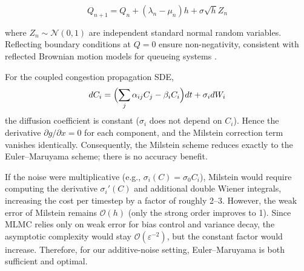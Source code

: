 \documentclass{ieeeaccess}
\begin{document}
\begin{equation}
    Q_{n+1} = Q_n + (\lambda_n - \mu_n)h + \sigma\sqrt{h}Z_n
    \label{eq:euler}
\end{equation}

\noindent where $Z_n \sim \mathcal{N}(0,1)$ are independent standard normal random variables.
Reflecting boundary conditions at $Q=0$ ensure non-negativity, consistent with reflected Brownian
motion models for queueing systems \cite{harrison1985}.
 
For the coupled congestion propagation SDE,
\begin{equation}\label{eq:3}
    dC_i = \Bigl(\sum_j \alpha_{ij}C_j - \beta_i C_i\Bigr)dt + \sigma_i dW_i
\end{equation}
the diffusion coefficient is constant (\(\sigma_i\) does not depend on \(C_i\)). 
Hence the derivative \(\partial g/\partial x = 0\) for each component, and the Milstein correction term vanishes identically. 
Consequently, the Milstein scheme reduces exactly to the Euler--Maruyama scheme; there is no accuracy benefit.

If the noise were multiplicative (e.g., \(\sigma_i(C) = \sigma_0 C_i\)), Milstein would require computing the derivative \(\sigma_i'(C)\) and additional double Wiener integrals, increasing the cost per timestep by a factor of roughly 2--3. 
However, the weak error of Milstein remains \(\mathcal{O}(h)\) (only the strong order improves to 1). 
Since MLMC relies only on weak error for bias control and variance decay, the asymptotic complexity would stay \(\mathcal{O}(\varepsilon^{-2})\), but the constant factor would increase. 
Therefore, for our additive‑noise setting, Euler--Maruyama is both sufficient and optimal.
\end{document}
